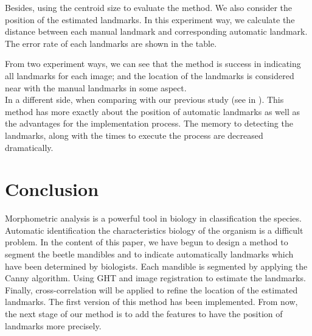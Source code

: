 \documentclass[twoside,twocolumn,10pt]{article}
\begin{document}
Besides, using the centroid size to evaluate the method. We also
consider the position of the estimated landmarks. In this experiment
way, we calculate the distance between each manual landmark and
corresponding automatic landmark. The error rate of each landmarks are
shown in the table.

From two experiment ways, we can see that the method is success in
indicating all landmarks for each image; and the location of the
landmarks is considered near with the manual landmarks in some
aspect.\\

In a different side, when comparing with our previous study (see in
\cite{est}). This method has more exactly about the position of
automatic landmarks as well as the advantages for the implementation
process. The memory to detecting the landmarks, along with the times
to execute the process are decreased dramatically.

\section{Conclusion}
Morphometric analysis is a powerful tool in biology in classification
the species. Automatic identification the characteristics biology of
the organism is a difficult problem. In the content of this paper, we
have begun to design a method to segment the beetle mandibles and to
indicate automatically landmarks which have been determined by
biologists. Each mandible is segmented by applying the Canny
algorithm. Using GHT and image registration to estimate the
landmarks. Finally, cross-correlation will be applied to refine the
location of the estimated landmarks. The first version of this method
has been implemented. From now, the next stage of our method is to add
the features to have the position of landmarks more precisely.




\end{document}
